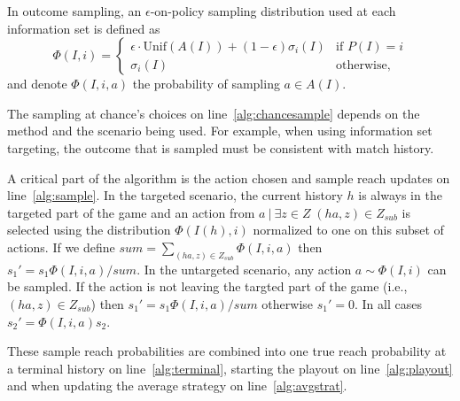 \documentclass[letterpaper]{article}
\newcommand{\cP}{\mathcal{P}}
\newcommand{\tth}{\mathtt{h}}
\begin{document}
In outcome sampling, an $\epsilon$-on-policy sampling distribution used at each information set
is defined as 
\begin{equation*}
\label{eq:ossample}
\Phi(I,i) = \left\{
\begin{array}{ll}
\epsilon \cdot \mbox{Unif}(A(I)) + (1-\epsilon)\sigma_i(I) & \mbox{if } P(I) = i\\ 
\sigma_i(I)                                          & \mbox{otherwise,}
\end{array} \right.
\end{equation*}
and denote $\Phi(I,i,a)$ the probability of sampling $a \in A(I)$. 

The sampling at chance's choices on line~\ref{alg:chancesample} depends on the method and the scenario being used. For example, when using information set targeting, the outcome that is sampled must be consistent with match history.

A critical part of the algorithm is the action chosen and sample reach updates on line~\ref{alg:sample}. In the targeted scenario, the current history $h$ is always in the targeted part of the game and an action from ${a~|~\exists z\in Z \; (ha,z)\in Z_{sub}}$ is selected using the distribution $\Phi(I(h),i)$ normalized to one on this subset of actions. If we define $sum=\sum_{(ha,z)\in Z_{sub}}\Phi(I,i,a)$ then $s_1' = s_1\Phi(I,i,a)/sum$. In the untargeted scenario, any action $a \sim \Phi(I,i)$ can be sampled. If the action is not leaving the targted part of the game (i.e., $(ha,z)\in Z_{sub}$) then $s_1' = s_1\Phi(I,i,a)/sum$ otherwise $s_1'=0$. In all cases $s_2' = \Phi(I,i,a) s_2$.

These sample reach probabilities are combined into one true reach probability at a terminal history on line~\ref{alg:terminal}, starting the playout on line~\ref{alg:playout} and when updating the average 
strategy on line~\ref{alg:avgstrat}. 

\end{document}
